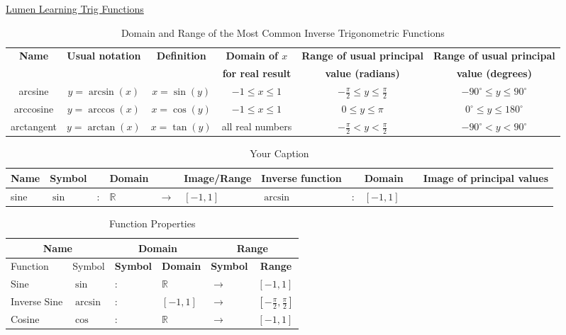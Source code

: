 
\href{https://courses.lumenlearning.com/precalculus/chapter/inverse-trigonometric-functions/}{Lumen Learning Trig Functions}

\begin{table}
\centering
\begin{tabular}{|c|c|c|c|c|c|}
\hline
\textbf{Name} & \textbf{Usual notation} & \textbf{Definition} & \textbf{Domain of \(x\)} & \textbf{Range of usual principal } & \textbf{Range of usual principal} \\
 & &  & \textbf{for real result} & \textbf{value (radians)} & \textbf{ value (degrees)} \\
\hline
arcsine & \(y=\arcsin(x)\) & \(x = \sin(y)\) & \(-1\leq x\leq 1\) & \(-\frac{\pi}{2}\leq y\leq \frac{\pi}{2}\) & \(-90^{\circ}\leq y\leq 90^{\circ}\) \\
\hline
arccosine & \(y=\arccos(x)\) & \(x = \cos(y)\) & \(-1\leq x\leq 1\) & \(0\leq y\leq \pi\) & \(0^{\circ}\leq y\leq 180^{\circ}\) \\
\hline
arctangent & \(y=\arctan(x)\) & \(x = \tan(y)\) & all real numbers & \(-\frac{\pi}{2}< y <\frac{\pi}{2}\) & \(-90^{\circ}< y <90^{\circ}\) \\
\hline
\end{tabular}
\caption{Domain and Range of the Most Common Inverse Trigonometric Functions}
\label{tab:CommonTrigFunctions}
\end{table}


\begin{table}[h]
\centering
\begin{tabular}{|l|l|l|l|l|l|l|l|l|l|l|}
\hline
\textbf{Name} & \textbf{Symbol} & & \textbf{Domain} & & \textbf{Image/Range} & \textbf{Inverse function} & & \textbf{Domain} & & \textbf{Image of principal values} \\
\hline
sine & $\sin$ & : & $\mathbb{R}$ & $\to$ & $[-1, 1]$ & $\arcsin$ & : & $[-1, 1]$ & & \\
\hline
\end{tabular}
\caption{Your Caption}
\label{tab:MoreTrig}
\end{table}




\begin{table}[h]
\centering
\caption{Function Properties}
\begin{tabular}{|l|l|l|l|l|l|}
\hline
\multicolumn{2}{|c|}{\textbf{Name}} & \multicolumn{2}{c|}{\textbf{Domain}} & \multicolumn{2}{c|}{\textbf{Range}} \\ \hline
Function & Symbol & \multicolumn{1}{c|}{\textbf{Symbol}} & \multicolumn{1}{c|}{\textbf{Domain}} & \multicolumn{1}{c|}{\textbf{Symbol}} & \multicolumn{1}{c|}{\textbf{Range}} \\ \hline
Sine & $\sin$ & : & $\mathbb{R}$ & $\to$ & $[-1, 1]$ \\ \hline
Inverse Sine & $\arcsin$ & : & $[-1, 1]$ & $\to$ & $\left[-\frac{\pi}{2}, \frac{\pi}{2}\right]$ \\ \hline
Cosine & $\cos$ & : & $\mathbb{R}$ & $\to$ & $[-1, 1]$ \\ \hline
\end{tabular}
\end{table}



